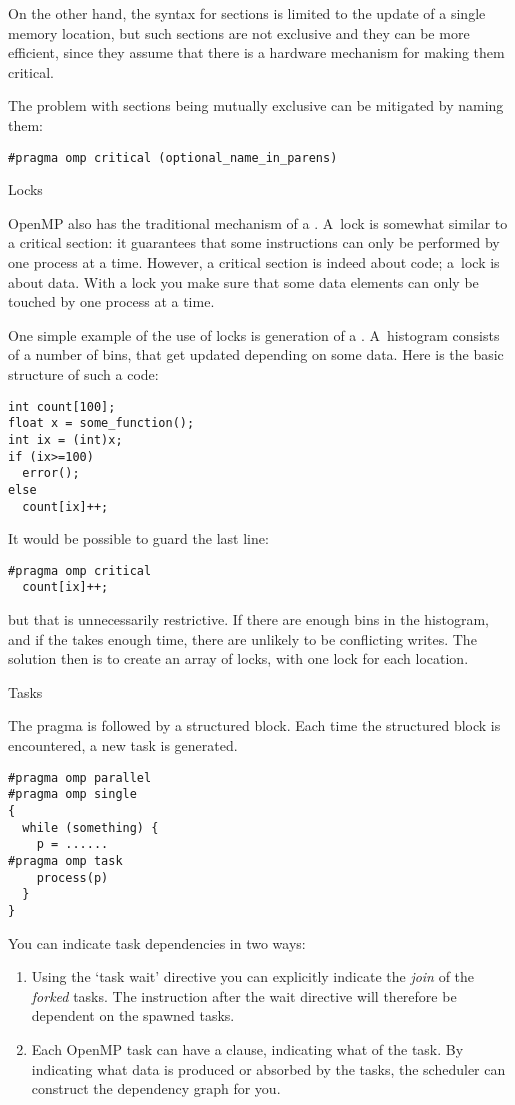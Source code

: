 On the other hand, the syntax for  sections is limited to the update
of a single memory location, but such sections
are not exclusive and they can be more efficient, since they assume that there is a hardware
mechanism for making them critical.

The problem with  sections being mutually exclusive can be mitigated by naming them:
\begin{verbatim}
#pragma omp critical (optional_name_in_parens)
\end{verbatim}

 {Locks}

OpenMP also has the traditional mechanism of a . A~lock is somewhat similar to 
a critical section: it guarantees that some instructions can only be performed by one
process at a time. However, a critical section is indeed about code; a~lock is about data.
With a lock you make sure that some data elements can only be touched by one process at a time.

One simple example of the use of locks is generation of a .
A~histogram consists of a number of bins, that get updated depending on some data.
Here is the basic structure of such a code:
\begin{verbatim}
int count[100];
float x = some_function();
int ix = (int)x;
if (ix>=100)
  error();
else
  count[ix]++;
\end{verbatim}
It would be possible to guard the last line:
\begin{verbatim}
#pragma omp critical
  count[ix]++;
\end{verbatim}
but that is unnecessarily restrictive. If there are enough bins in the
histogram, and if the  takes enough time, there are unlikely to be
conflicting writes. The solution then is to create an array of locks, with
one lock for each  location.


 {Tasks}

The  pragma is followed by a structured block.
Each time the structured block is encountered, a new task is generated.
\begin{verbatim}
#pragma omp parallel
#pragma omp single
{
  while (something) {
    p = ......
#pragma omp task
    process(p)
  }
}
\end{verbatim}

You can indicate task dependencies in two ways:
\begin{enumerate}
\item Using the `task wait' directive you can explicitly indicate
  the \emph{join} of the
  \emph{forked} tasks. The instruction after the wait directive
  will therefore be dependent on the spawned tasks.
\item Each OpenMP task can have a 
  clause, indicating what  of the task.
  By indicating what data is produced or absorbed by the tasks,
  the scheduler can construct the dependency graph for you.
\end{enumerate}

